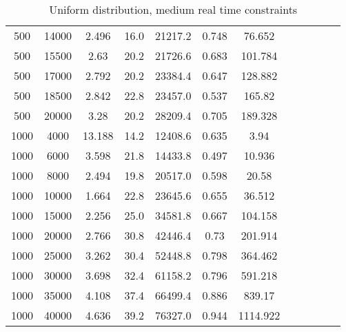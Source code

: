 \begin{table}[htb]
\begin{tabular}{|c|c|c|c|c|c|c|c|c|c|c|c|}
		500 & 14000 & 2.496 & 16.0 & 21217.2 & 0.748 & 76.652 & & & & &  \\ 
		500 & 15500 & 2.63 & 20.2 & 21726.6 & 0.683 & 101.784 & & & & &  \\ 
		500 & 17000 & 2.792 & 20.2 & 23384.4 & 0.647 & 128.882 & & & & &  \\ 
		500 & 18500 & 2.842 & 22.8 & 23457.0 & 0.537 & 165.82 & & & & &  \\ 
		500 & 20000 & 3.28 & 20.2 & 28209.4 & 0.705 & 189.328 & & & & &  \\ 
		1000 & 4000 & 13.188 & 14.2 & 12408.6 & 0.635 & 3.94 & & & & &  \\ 
		1000 & 6000 & 3.598 & 21.8 & 14433.8 & 0.497 & 10.936 & & & & &  \\ 
		1000 & 8000 & 2.494 & 19.8 & 20517.0 & 0.598 & 20.58 & & & & &  \\ 
		1000 & 10000 & 1.664 & 22.8 & 23645.6 & 0.655 & 36.512 & & & & &  \\ 
		1000 & 15000 & 2.256 & 25.0 & 34581.8 & 0.667 & 104.158 & & & & &  \\ 
		1000 & 20000 & 2.766 & 30.8 & 42446.4 & 0.73 & 201.914 & & & & &  \\ 
		1000 & 25000 & 3.262 & 30.4 & 52448.8 & 0.798 & 364.462 & & & & &  \\ 
		1000 & 30000 & 3.698 & 32.4 & 61158.2 & 0.796 & 591.218 & & & & &  \\ 
		1000 & 35000 & 4.108 & 37.4 & 66499.4 & 0.886 & 839.17 & & & & &  \\ 
		1000 & 40000 & 4.636 & 39.2 & 76327.0 & 0.944 & 1114.922 & & & & &  \\ 
		\hline 
	\end{tabular} 
	\caption{Uniform distribution, medium real time constraints} 
	\label{tab:unif_m} 
\end{table} 

